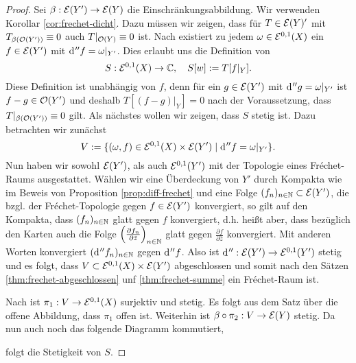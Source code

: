 \begin{proof}
  Sei $\beta: \mathcal{E}(Y') \rightarrow \mathcal{E}(Y)$ die Einschränkungsabbildung. Wir
  verwenden Korollar \ref{cor:frechet-dicht}. Dazu müssen wir zeigen, dass für $T \in
  \mathcal{E}(Y)'$ mit $T_{\beta(\mathcal{O}(Y'))} \equiv 0$ auch $T|_{\mathcal{O}(Y)}
  \equiv 0$ ist. 
  Nach \cite[Kor. 14.16]{For} existiert zu jedem $\omega \in \mathcal{E}^{0,1}(X)$ ein $f \in
  \mathcal{E}(Y')$ mit $\d[''f] = \omega|_{Y'}$. 
  Dies erlaubt uns die Definition von
  \[
  S: \mathcal{E}^{0,1}(X) \rightarrow \mathbb{C}, \quad S[w] := T[f|_Y].
  \]
  Diese Definition ist unabhängig von $f$, denn für
  ein $g \in \mathcal{E}(Y')$ mit $\d[''g] = \omega|_{Y'}$ ist $f-g
  \in \mathcal{O}(Y')$ und deshalb $T[(f-g)|_Y] = 0$ nach der Voraussetzung,
  dass $T|_{\beta(\mathcal{O}(Y'))} \equiv 0$ gilt. 
  Als nächstes wollen wir zeigen, dass $S$ stetig ist. 
  Dazu betrachten wir zunächst
  \[
  V := \{ (\omega, f) \in \diff^{0,1}(X) \times \diff(Y') \mid \d[''f] = \omega|_{Y'} \}.
  \]
  Nun haben wir
  sowohl $\mathcal{E}(Y')$, als auch $\mathcal{E}^{0,1}(Y')$ mit der Topologie
  eines Fr\'echet-Raums ausgestattet. Wählen wir eine Überdeckung von
  $Y'$ durch Kompakta wie im Beweis von Proposition
  \ref{prop:diff-frechet} und eine Folge $(f_n)_{n\in \mathbb{N}} \subset
  \mathcal{E}(Y')$, die bzgl. der Fr\'echet-Topologie gegen $f \in \mathcal{E}(Y')$
  konvergiert, so gilt auf den Kompakta, dass $(f_n)_{n\in \mathbb{N}}$ glatt
  gegen $f$ konvergiert, d.h. heißt aber, dass bezüglich den Karten
  auch die Folge $\left(\frac{\partial f_n}{\partial \bar z} \right
  )_{n \in\mathbb{N}}$ glatt gegen $\frac{\partial f}{\partial \bar
      z}$ konvergiert. Mit anderen Worten konvergiert
    $(\d[''f_n])_{n\in \N}$ gegen $\d[''f]$. Also ist 
  $\d['']: \diff(Y') \ra \diff^{0,1}(Y')$ stetig und es folgt, dass $V
  \subset \mathcal{E}^{0,1}(X) \times \mathcal{E}(Y')$ abgeschlossen und somit
  nach den Sätzen \ref{thm:frechet-abgeschlossen} unf \ref{thm:frechet-summe} ein
  Fr\'echet-Raum ist.
  
  Nach \cite[Kor. 14.16]{For} ist $\pi_1: V \rightarrow \mathcal{E}^{0,1}(X)$
  surjektiv und stetig. Es folgt aus dem Satz über die offene
  Abbildung, dass $\pi_1$ offen ist.
  Weiterhin ist $\beta \circ \pi_2 : V \rightarrow \mathcal{E}(Y)$ stetig. Da nun
  auch noch das folgende Diagramm kommutiert,
  \begin{center}
  \end{center}
  folgt die Stetigkeit von $S$.


\end{proof}
